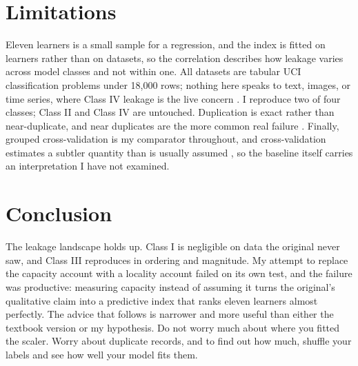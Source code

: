\documentclass[10pt,twocolumn]{article}
\begin{document}
\section{Limitations}

Eleven learners is a small sample for a regression, and the index is fitted on
learners rather than on datasets, so the correlation describes how leakage varies
across model classes and not within one. All datasets are tabular UCI
classification problems under 18{,}000 rows; nothing here speaks to text, images,
or time series, where Class IV leakage is the live concern
\cite{roberts2017,bergmeir2012}. I reproduce two of four classes; Class II and
Class IV are untouched. Duplication is exact rather than near-duplicate, and near
duplicates are the more common real failure \cite{barz2020,recht2019}. Finally,
grouped cross-validation is my comparator throughout, and cross-validation
estimates a subtler quantity than is usually assumed \cite{bates2024}, so the
baseline itself carries an interpretation I have not examined.

\section{Conclusion}

The leakage landscape holds up. Class I is negligible on data the original never
saw, and Class III reproduces in ordering and magnitude. My attempt to replace
the capacity account with a locality account failed on its own test, and the
failure was productive: measuring capacity instead of assuming it turns the
original's qualitative claim into a predictive index that ranks eleven learners
almost perfectly. The advice that follows is narrower and more useful than
either the textbook version or my hypothesis. Do not worry much about where you
fitted the scaler. Worry about duplicate records, and to find out how much,
shuffle your labels and see how well your model fits them.
\end{document}
